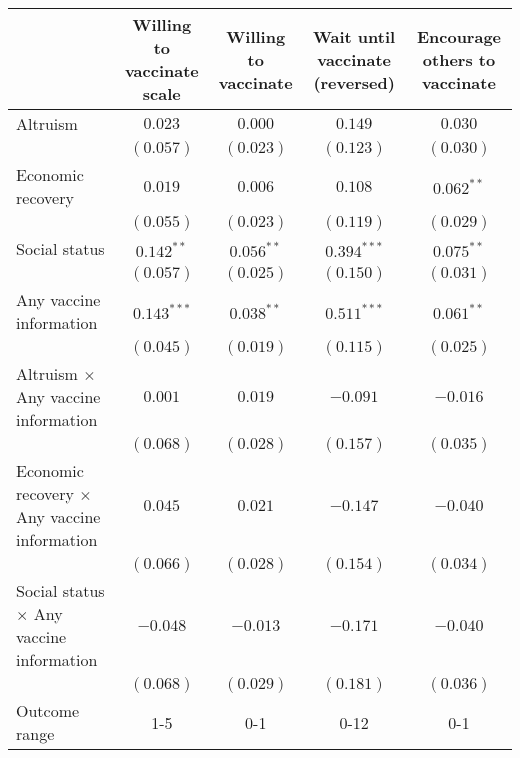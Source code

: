 \begin{table}
\begin{center}
\begin{tabular}{l c c c c}
\hline
 & Willing to vaccinate scale & Willing to vaccinate & Wait until vaccinate (reversed) & Encourage others to vaccinate \\
\hline
Altruism                                           & $0.023$       & $0.000$      & $0.149$       & $0.030$      \\
                                                   & $(0.057)$     & $(0.023)$    & $(0.123)$     & $(0.030)$    \\
Economic recovery                                  & $0.019$       & $0.006$      & $0.108$       & $0.062^{**}$ \\
                                                   & $(0.055)$     & $(0.023)$    & $(0.119)$     & $(0.029)$    \\
Social status                                      & $0.142^{**}$  & $0.056^{**}$ & $0.394^{***}$ & $0.075^{**}$ \\
                                                   & $(0.057)$     & $(0.025)$    & $(0.150)$     & $(0.031)$    \\
Any vaccine information                            & $0.143^{***}$ & $0.038^{**}$ & $0.511^{***}$ & $0.061^{**}$ \\
                                                   & $(0.045)$     & $(0.019)$    & $(0.115)$     & $(0.025)$    \\
Altruism $\times$ Any vaccine information          & $0.001$       & $0.019$      & $-0.091$      & $-0.016$     \\
                                                   & $(0.068)$     & $(0.028)$    & $(0.157)$     & $(0.035)$    \\
Economic recovery $\times$ Any vaccine information & $0.045$       & $0.021$      & $-0.147$      & $-0.040$     \\
                                                   & $(0.066)$     & $(0.028)$    & $(0.154)$     & $(0.034)$    \\
Social status $\times$ Any vaccine information     & $-0.048$      & $-0.013$     & $-0.171$      & $-0.040$     \\
                                                   & $(0.068)$     & $(0.029)$    & $(0.181)$     & $(0.036)$    \\
\hline
Outcome range                                      & 1-5           & 0-1          & 0-12          & 0-1          \\

\end{tabular}
\end{center}
\end{table}
